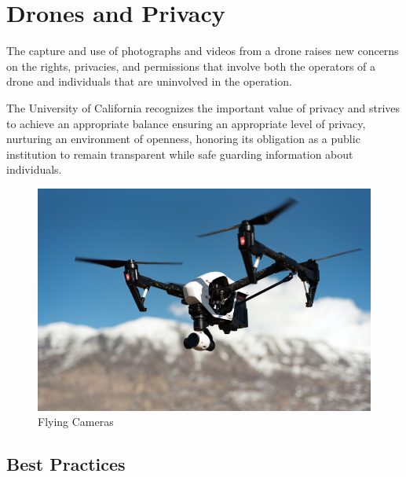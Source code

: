 \documentclass[
  12pt,
]{book}
\begin{document}
\chapter{Drones and Privacy}\label{ch-privacy}

The capture and use of photographs and videos from a drone raises new concerns on the rights, privacies, and permissions that involve both the operators of a drone and individuals that are uninvolved in the operation.

The University of California recognizes the important value of privacy and strives to achieve an appropriate balance ensuring an appropriate level of privacy, nurturing an environment of openness, honoring its obligation as a public institution to remain transparent while safe guarding information about individuals.

\begin{figure}

{\centering \includegraphics[width=0.75\linewidth]{images/inspire_1} 

}

\caption{Flying Cameras}\label{fig:drone1}
\end{figure}

\section{Best Practices}\label{best-practices}
\end{document}
